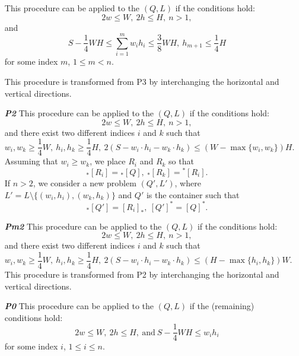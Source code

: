 \documentclass{article}
\theoremstyle{definition}
\theoremstyle{theorem}
\numberwithin{proposition}{section}
\begin{document}
\begin{enumerate}
            This procedure can be applied to the $(Q, L)$ if the conditions hold:
            \begin{equation*}
                2w\leq W,~2h\leq H,~n>1,
            \end{equation*}
            and 
            \begin{equation*}
                S-\frac{1}{4}WH\leq \sum_{i=1}^{m}w_ih_i\leq \frac{3}{8}WH,~h_{m+1}\leq\frac{1}{4}H
            \end{equation*}
            for some index $m$, $1 \leq m < n$.

            This procedure is transformed from P3 by interchanging the horizontal and vertical directions.
        \item[\textbf{\textit{P2}}]
            This procedure can be applied to the $(Q, L)$ if the conditions hold: 
            \begin{equation*}
                2w\leq W,~2h\leq H,~n>1,
            \end{equation*}
            and there exist two different indices $i$ and $k$ such that
            \begin{equation*}
                w_i,w_k \geq \frac{1}{4}W,~h_i,h_k \geq \frac{1}{4}H,~2(S-w_i\cdot h_i - w_k\cdot h_k)\leq (W - \max\{w_i,w_k\})H.
            \end{equation*}
            Assuming that $w_i \geq w_k$, we place $R_i$ and $R_k$ so that 
            \begin{equation*}
                {}_{*}[R_i] = {}_{*}[Q],~{}_{*}[R_k] = {}^{*}[R_i].
            \end{equation*}
            If $n > 2$, we consider a new problem $(Q',L')$, where $L' = L\setminus\{(w_i,h_i), (w_k,h_k)\}$ and $Q'$ is the container such that
            \begin{equation*}
                {}_{*}[Q'] = [R_i]_{*},~[Q']^{*} = [Q]^{*}.
            \end{equation*}
        \item[\textbf{\textit{Pm2}}]
            This procedure can be applied to the $(Q, L)$ if the conditions hold: 
            \begin{equation*}
                2w\leq W,~2h\leq H,~n>1,
            \end{equation*}
            and there exist two different indices $i$ and $k$ such that
            \begin{equation*}
                w_i,w_k \geq \frac{1}{4}W,~h_i,h_k \geq \frac{1}{4}H,~2(S-w_i\cdot h_i -w_k\cdot h_k)\leq (H-\max\{h_i,h_k\})W.
            \end{equation*}
            This procedure is transformed from P2 by interchanging the horizontal and vertical directions.
        \item[\textbf{\textit{P0}}]
            This procedure can be applied to the $(Q, L)$ if the (remaining) conditions hold:
            \begin{equation*}
                2w\leq W,~2h\leq H,~\text{and}~S-\frac{1}{4}WH\leq w_ih_i
            \end{equation*}
            for some index $i$, $1 \leq i \leq n$.


\end{enumerate}
\end{document}
